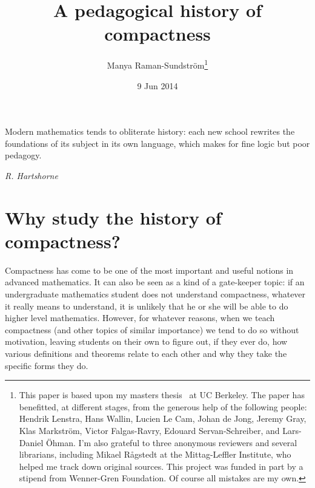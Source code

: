 \documentclass[12pt]{article}
\begin{document}
\date{ 9 Jun 2014 }
\title{A pedagogical history of compactness}
\author{Manya Raman-Sundstr\"{o}m\thanks{This paper is based upon my masters thesis~\cite{rama} at UC Berkeley. The paper has benefitted, at different stages, from the generous help of the following people:  Hendrik Lenstra, Hans Wallin, Lucien Le Cam, Johan de Jong, Jeremy Gray, Klas Markstr\"{o}m, Victor Falgas-Ravry, Edouard Servan-Schreiber, and Lars-Daniel \"{O}hman. I'm also grateful to three anonymous reviewers and several librarians, including Mikael R\r{a}gstedt at the Mittag-Leffler Institute, who helped me track down original sources. This project was funded in part by a stipend from Wenner-Gren Foundation. Of course all mistakes are my own.}}

\maketitle



\begin{flushright}
\parbox{2.8 in}{Modern mathematics tends to obliterate history:  
each new school rewrites the foundations of its subject 
in its own language, which makes for fine logic but poor pedagogy.}

\emph{R. Hartshorne}
\end{flushright}


\section{Why study the history of compactness?}

Compactness has come to be one of the most important and useful notions in advanced
mathematics. It can also be seen as a kind of a gate-keeper topic: if an undergraduate mathematics student does not understand compactness, whatever it really means to understand, it is unlikely that he or she will be able to do higher level mathematics. However, for whatever reasons, when we teach compactness (and other topics of similar importance) we tend to do so without motivation, leaving students on their own to figure out, if they ever do, how various definitions and theorems relate to each other and why they take the specific forms they do.
\end{document}
